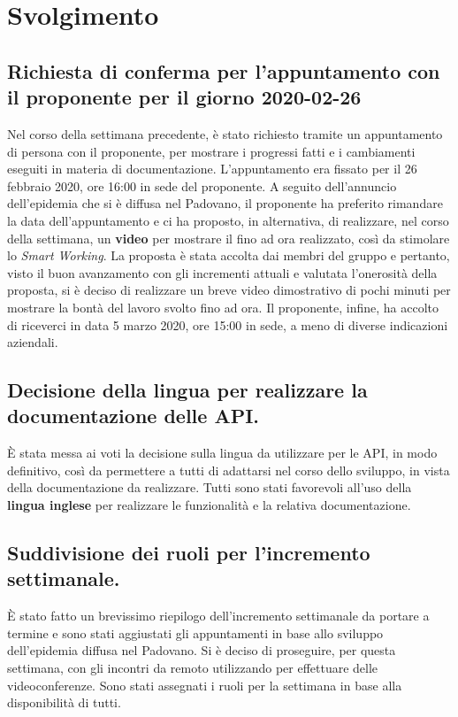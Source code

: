 \newpage
\section*{Svolgimento}

	\subsection*{Richiesta di conferma per l'appuntamento con il proponente per il giorno 2020-02-26}
		Nel corso della settimana precedente, è stato richiesto tramite  un appuntamento di persona con il proponente, per mostrare i progressi fatti e i cambiamenti eseguiti in materia di documentazione.
		\newline
		L'appuntamento era fissato per il 26 febbraio 2020, ore 16:00 in sede del proponente. A seguito dell'annuncio dell'epidemia che si è diffusa nel Padovano, il proponente ha preferito rimandare la data dell'appuntamento e ci ha proposto, in alternativa, di realizzare, nel corso della settimana, un \textbf{video} per mostrare il  fino ad ora realizzato, così da stimolare lo \textit{Smart Working}.
		\newline
		La proposta è stata accolta dai membri del gruppo e pertanto, visto il buon avanzamento con gli incrementi attuali e valutata l'onerosità della proposta, si è deciso di realizzare un breve video dimostrativo di pochi minuti per mostrare la bontà del lavoro svolto fino ad ora.
		\newline
		Il proponente, infine, ha accolto di riceverci in data 5 marzo 2020, ore 15:00 in sede, a meno di diverse indicazioni aziendali.

	\subsection*{Decisione della lingua per realizzare la documentazione delle API.}
		È stata messa ai voti la decisione sulla lingua da utilizzare per le API, in modo definitivo, così da permettere a tutti di adattarsi nel corso dello sviluppo, in vista della documentazione da realizzare.
		\newline
		Tutti sono stati favorevoli all'uso della \textbf{lingua inglese} per realizzare le funzionalità e la relativa documentazione.

	\subsection*{Suddivisione dei ruoli per l'incremento settimanale.}
		È stato fatto un brevissimo riepilogo dell'incremento settimanale da portare a termine e sono stati aggiustati gli appuntamenti in base allo sviluppo dell'epidemia diffusa nel Padovano.
		\newline
		Si è deciso di proseguire, per questa settimana, con gli incontri da remoto utilizzando  per effettuare delle videoconferenze. Sono stati assegnati i ruoli per la settimana in base alla disponibilità di tutti.

